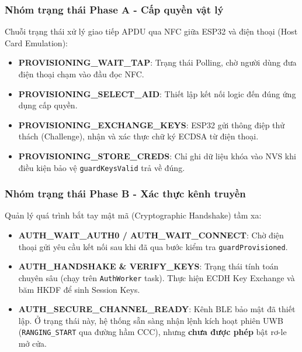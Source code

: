 \subsubsection{Nhóm trạng thái Phase A - Cấp quyền vật lý}
Chuỗi trạng thái xử lý giao tiếp APDU qua NFC giữa ESP32 và điện thoại (Host Card Emulation):
\begin{itemize}
  \item \textbf{PROVISIONING\_WAIT\_TAP}: Trạng thái Polling, chờ người dùng đưa điện thoại chạm vào đầu đọc NFC.
  \item \textbf{PROVISIONING\_SELECT\_AID}: Thiết lập kết nối logic đến đúng ứng dụng cấp quyền.
  \item \textbf{PROVISIONING\_EXCHANGE\_KEYS}: ESP32 gửi thông điệp thử thách (Challenge), nhận và xác thực chữ ký ECDSA từ điện thoại.
  \item \textbf{PROVISIONING\_STORE\_CREDS}: Chỉ ghi dữ liệu khóa vào NVS khi điều kiện bảo vệ \texttt{guardKeysValid} trả về đúng.
\end{itemize}

\subsubsection{Nhóm trạng thái Phase B - Xác thực kênh truyền}
Quản lý quá trình bắt tay mật mã (Cryptographic Handshake) tầm xa:
\begin{itemize}
  \item \textbf{AUTH\_WAIT\_AUTH0 / AUTH\_WAIT\_CONNECT}: Chờ điện thoại gửi yêu cầu kết nối sau khi đã qua bước kiểm tra \texttt{guardProvisioned}.
  \item \textbf{AUTH\_HANDSHAKE \& VERIFY\_KEYS}: Trạng thái tính toán chuyên sâu (chạy trên \texttt{AuthWorker} task). Thực hiện ECDH Key Exchange và băm HKDF để sinh Session Keys.
  \item \textbf{AUTH\_SECURE\_CHANNEL\_READY}: Kênh BLE bảo mật đã thiết lập. Ở trạng thái này, hệ thống sẵn sàng nhận lệnh kích hoạt phiên UWB (\texttt{RANGING\_START} qua đường hầm CCC), nhưng \textbf{chưa được phép} bật rơ-le mở cửa.
\end{itemize}

